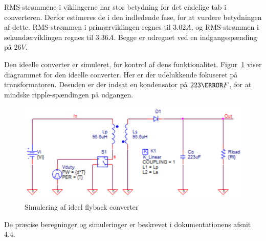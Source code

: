 RMS-strømmene i viklingerne har stor betydning for det endelige tab i converteren. Derfor estimeres de i den indledende fase, for at vurdere betydningen af dette. RMS-strømmen i primærviklingen regnes til $3.02A$, og RMS-strømmen i sekundærviklingen regnes til $3.36A$. Begge er udregnet ved en indgangsspænding på $26V$. 

Den ideelle converter er simuleret, for kontrol af dens funktionalitet. Figur~\ref{fig:flyabck_ideal_diagram} viser diagrammet for den ideelle converter. Her er der udelukkende fokuseret på transformatoren. Desuden er der indsat en kondensator på $223\micro F$, for at mindske ripple-spændingen på udgangen. 

\begin{figure}[H]
	\centering
	\includegraphics[width=0.7\linewidth]{../Dokumentation/tex/1iteration/billeder/flyback_ideal_diagram.png}
	\caption{Simulering af ideel flyback converter}
	\label{fig:flyabck_ideal_diagram}
\end{figure}

\noindent De præcise beregninger og simuleringer er beskrevet i dokumentationens afsnit 4.4.






